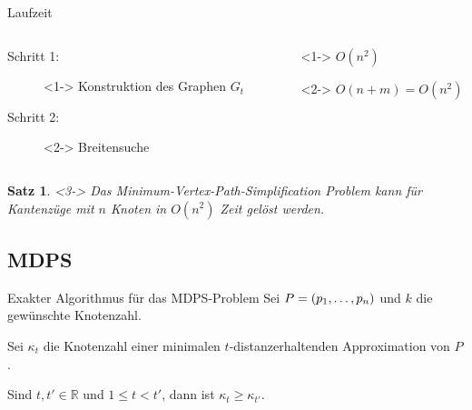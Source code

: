 \documentclass{beamer}
\newtheorem{thm}{Satz}
\begin{document}
	\begin{frame}{Laufzeit}
		\begin{columns}
			\begin{column}{0.6\linewidth}
				\begin{description}
					\item[Schritt 1:]<1-> Konstruktion des Graphen $G_t$
					\item[Schritt 2:]<2-> Breitensuche
				\end{description}
			\end{column}
			\begin{column}{0.5\linewidth}
				\begin{description}
					\item[]<1-> $O(n^2)$
					\item[]<2-> $O(n + m) = O(n^2)$
				\end{description}
			\end{column}
		\end{columns}
		\begin{thm}<3->
			Das Minimum-Vertex-Path-Simplification Problem kann für Kantenzüge mit $n$ Knoten in $O(n^2)$ Zeit gelöst werden.
		\end{thm}
	\end{frame}
	
	\subsection{MDPS}
	\begin{frame}{Exakter Algorithmus für das MDPS-Problem}
		Sei $P = (p_1, \mathellipsis, p_n)$ und $k$ die gewünschte Knotenzahl.
		
		Sei $\kappa_t$ die Knotenzahl einer minimalen $t$-distanzerhaltenden Approximation von $P$.
		
		\begin{lemma}
			Sind $t, t' \in \mathbb{R}$ und $1 \leq t < t'$, dann ist $\kappa_t \geq \kappa_{t'}$.
		\end{lemma}
	\end{frame}
	
\end{document}

